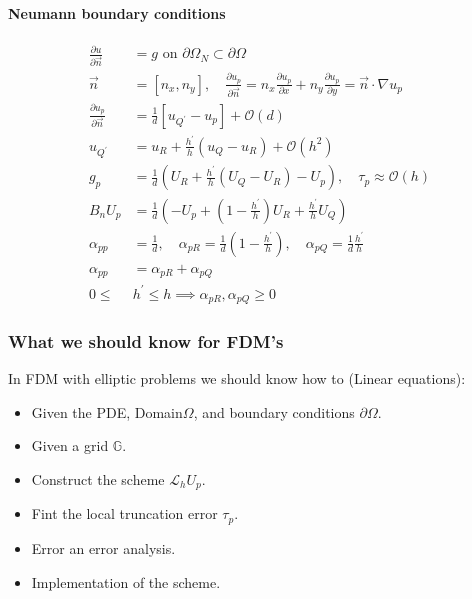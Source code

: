 \paragraph{Neumann boundary conditions}
\begin{align*}
  \frac{\partial u}{\partial \vec{n}} &= g \text{ on } \partial\Omega_N \subset \partial\Omega \\
  \vec{n} &= \left[n_x, n_y\right], \quad \frac{\partial u_p}{\partial \vec{n}} = n_x \frac{\partial u_p}{\partial x} + n_y \frac{\partial u_p}{\partial y} = \vec{n} \cdot \nabla u_p \\
  \frac{\partial u_p}{\partial \vec{n}} &= \frac{1}{d}\left[u_{Q^\prime} - u_p\right] + \mathcal{O}(d) \\
  u_{Q^\prime} &= u_R + \frac{h^\prime}{h}\left(u_Q - u_R\right) + \mathcal{O}(h^2) \\
  g_p &= \frac{1}{d}\left(U_R + \frac{h^\prime}{h}\left(U_Q - U_R\right) - U_p\right), \quad \tau_p \approx \mathcal{O}(h) \\
  B_n U_p &= \frac{1}{d}\left(-U_p + (1-\frac{h^\prime}{h})U_R + \frac{h^\prime}{h}U_Q\right)\\ 
  \alpha_{pp} &= \frac{1}{d}, \quad \alpha_{pR} = \frac{1}{d}\left(1-\frac{h^\prime}{h}\right), \quad \alpha_{pQ} = \frac{1}{d}\frac{h^\prime}{h} \\
  \alpha_{pp} &= \alpha_{pR} + \alpha_{pQ} \\
  0 \le & h^\prime \le h \implies \alpha_{pR}, \alpha_{pQ} \ge 0
  \end{align*}

  \subsubsection{What we should know for FDM's}
  
  In FDM with elliptic problems we should know how to (Linear equations):
  \begin{itemize}
    \item Given the PDE, Domain\(\Omega\), and boundary conditions \(\partial\Omega\).
    \item Given a grid \(\mathbb{G}\).
    \item Construct the scheme \(\mathcal{L}_h U_p\).
    \item Fint the local truncation error \(\tau_p\).
    \item Error an error analysis.
    \item Implementation of the scheme.
  \end{itemize}

